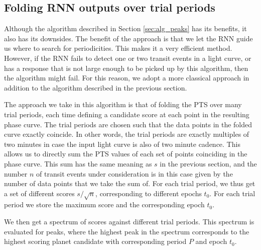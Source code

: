 \subsection{Folding RNN outputs over trial periods}
\label{sec:alg_folding}
Although the algorithm described in Section \ref{sec:alg_peaks} has its benefits, it also has its downsides. The benefit of the approach is that we let the RNN guide us where to search for periodicities. This makes it a very efficient method. However, if the RNN fails to detect one or two transit events in a light curve, or has a response that is not large enough to be picked up by this algorithm, then the algorithm might fail. For this reason, we adopt a more classical approach in addition to the algorithm described in the previous section. 

The approach we take in this algorithm is that of folding the PTS over many trial periods, each time defining a candidate score at each point in the resulting phase curve. The trial periods are chosen such that the data points in the folded curve exactly coincide. In other words, the trial periods are exactly multiples of two minutes in case the input light curve is also of two minute cadence. This allows us to directly sum the PTS values of each set of points coinciding in the phase curve. This sum has the same meaning as $s$ in the previous section, and the number $n$ of transit events under consideration is in this case given by the number of data points that we take the sum of. For each trial period, we thus get a set of different scores $s/\sqrt{n}$, corresponding to different epochs $t_0$. For each trial period we store the maximum score and the corresponding epoch $t_0$. 

We then get a spectrum of scores against different trial periods. This spectrum is evaluated for peaks, where the highest peak in the spectrum corresponds to the highest scoring planet candidate with corresponding period $P$ and epoch $t_0$.

